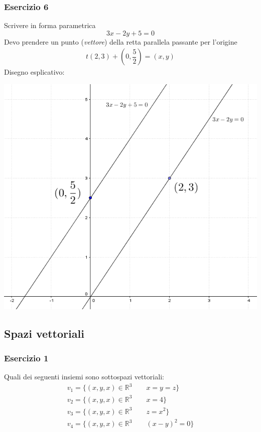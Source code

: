 \documentclass[italian]{article}
\newcommand{\ins}[1]{\text{$\mathbb{#1}$}}
\begin{document}
\subsubsection{Esercizio 6}
Scrivere in forma parametrica
\[
	3x-2y+5=0
\]
Devo prendere un punto (\textit{vettore}) della retta parallela passante per l'origine
\begin{gather*}
	t(2,3) + \left( 0, \dfrac{5}{2} \right) = (x,y)
\end{gather*}
Disegno esplicativo:
\begin{center}
	\includegraphics[width=0.5\linewidth]{img/vettori_forma_parametrica.png}
\end{center}


\newpage
\subsection{Spazi vettoriali}
\subsubsection{Esercizio 1}
Quali dei seguenti insiemi sono sottospazi vettoriali:
\begin{gather*}
	v_1 = \{ (x,y,x) \in \ins{R}^3 \qquad x=y=z \} \\
	v_2 = \{ (x,y,x) \in \ins{R}^3 \qquad x=4 \} \\
	v_3 = \{ (x,y,x) \in \ins{R}^3 \qquad z=x^2 \} \\
	v_4 = \{ (x,y,x) \in \ins{R}^3 \qquad (x-y)^2=0 \}
\end{gather*}
\end{document}
